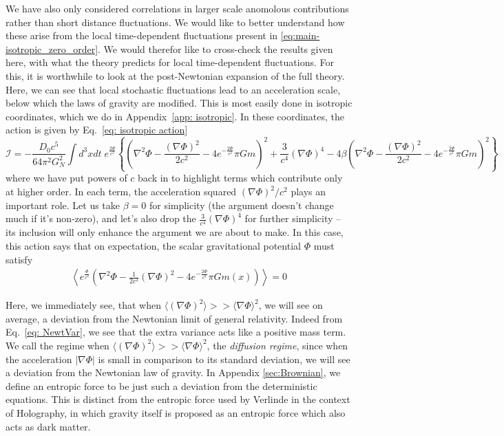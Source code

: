 \documentclass[aps,pra,amsmath,amssymb,amsthm,floatfix,nofootinbib,notitlepage,superscriptaddress,10pt]{revtex4-2}
\def\actionC{\mathcal{I}}
\begin{document}
We have also only considered correlations in larger scale anomolous contributions rather than 
short distance fluctuations. We would like to better understand how these arise from the local time-dependent fluctuations present in \eqref{eq:main-isotropic_zero_order}.
We would therefor like to cross-check the results given here, with what the theory predicts for local time-dependent fluctuations. For this, it is worthwhile to look at the post-Newtonian expansion of the full theory. Here, we can see that local stochastic fluctuations lead to an acceleration scale, below which the laws of gravity are modified. This is most easily done in isotropic coordinates, which we do in Appendix~\ref{app: isotropic}. In these coordinates, the action is given by Eq.~\eqref{eq: isotropic action}
\begin{equation}
\actionC=-\frac{D_0 c^5}{64\pi^2G_N^2}\int d^3xdt\; e^{\frac{2\Phi}{c^2}}\left\{\left(\nabla^2\Phi-\frac{(\nabla\Phi)^2}{2c^2}-4e^{-\frac{2\Phi}{c^2}}\pi Gm\right)^2+\frac{3}{c^4}(\nabla\Phi)^4-4\beta\left(\nabla^2\Phi-\frac{(\nabla\Phi)^2}{2c^2}-4e^{-\frac{2\Phi}{c^2}}\pi Gm \right)^2\right\}
\label{eq: isotropic action main}
\end{equation}
where we have put powers of $c$ back in to highlight terms which contribute only at higher order.
In each term, the acceleration squared $(\nabla\Phi)^2/c^2$ plays an important role. Let us take $\beta=0$ for simplicity (the argument doesn't change much if it's non-zero), and let's also drop the $\frac{3}{c^4}(\nabla\Phi)^4$ for further simplicity -- its inclusion will only enhance the argument we are about to make. In this case, this action says that on expectation, the scalar gravitational potential $\Phi$ must satisfy
\begin{align}
	\left\langle e^{\frac{\Phi}{c^2}}\left(\nabla^2\Phi-\frac{1}{2c^2}(\nabla\Phi)^2-
 4e^{-\frac{2\Phi}{c^2}}\pi Gm(x)\right)\right\rangle=0
	\label{eq: NewtVar}
\end{align}

Here, we immediately see, that when $\langle (\nabla\Phi)^2\rangle>> \langle\nabla\Phi\rangle^2$, 
we will see on average, a deviation from the Newtonian limit of general relativity. Indeed from
Eq.~\eqref{eq: NewtVar}, we see that the extra variance acts like a positive mass term.
We call the regime when  $\langle (\nabla\Phi)^2\rangle>> \langle\nabla\Phi\rangle^2$, the {\it diffusion regime}, since when the acceleration $|\nabla\Phi|$ is small in comparison to its standard deviation, we will see a deviation from the Newtonian law of gravity. In Appendix \ref{sec:Brownian}, we define an entropic force to be just such a deviation from the deterministic equations. 
This is distinct from the entropic force used by Verlinde in the context of Holography, in which gravity itself is proposed as an entropic force which also acts as dark matter\cite{Verlinde_2017}.
\end{document}
